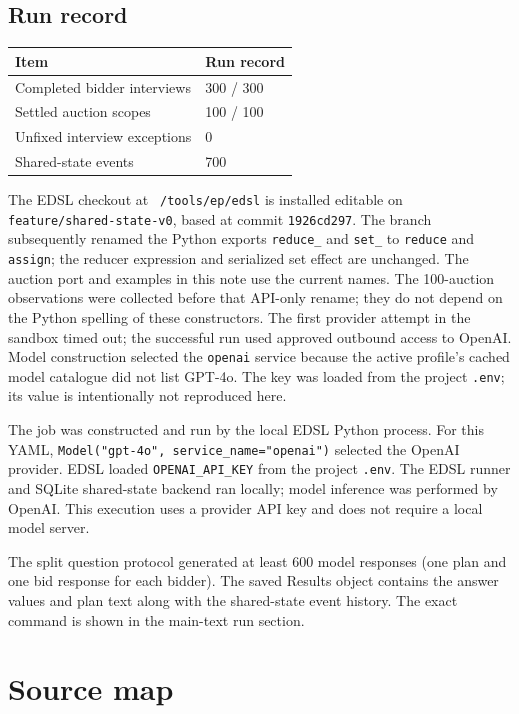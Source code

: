 \documentclass[11pt]{article}
\begin{document}
\subsection{Run record}

\begin{center}
\begin{tabular}{ll}
\toprule
Item & Run record \\
\midrule
Completed bidder interviews & 300 / 300 \\
Settled auction scopes & 100 / 100 \\
Unfixed interview exceptions & 0 \\
Shared-state events & 700 \\
\bottomrule
\end{tabular}
\end{center}

The EDSL checkout at \texttt{~/tools/ep/edsl} is installed editable on \texttt{feature/shared-state-v0}, based at commit \texttt{1926cd297}. The branch subsequently renamed the Python exports \texttt{reduce\_} and \texttt{set\_} to \texttt{reduce} and \texttt{assign}; the reducer expression and serialized set effect are unchanged. The auction port and examples in this note use the current names. The 100-auction observations were collected before that API-only rename; they do not depend on the Python spelling of these constructors. The first provider attempt in the sandbox timed out; the successful run used approved outbound access to OpenAI. Model construction selected the \texttt{openai} service because the active profile's cached model catalogue did not list GPT-4o. The key was loaded from the project \texttt{.env}; its value is intentionally not reproduced here.

The job was constructed and run by the local EDSL Python process. For this YAML, \texttt{Model("gpt-4o", service\_name="openai")} selected the OpenAI provider. EDSL loaded \texttt{OPENAI\_API\_KEY} from the project \texttt{.env}. The EDSL runner and SQLite shared-state backend ran locally; model inference was performed by OpenAI. This execution uses a provider API key and does not require a local model server.

The split question protocol generated at least 600 model responses (one plan and one bid response for each bidder). The saved Results object contains the answer values and plan text along with the shared-state event history. The exact command is shown in the main-text run section.

\section{Source map}
\end{document}

